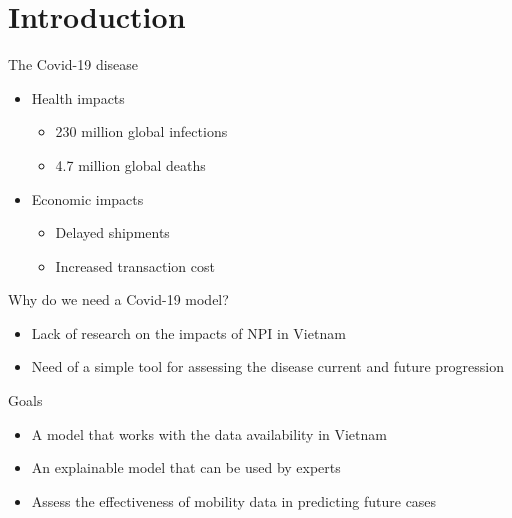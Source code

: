 \section{Introduction}

\begin{frame}{The Covid-19 disease}
\begin{itemize}
    \item<1-> Health impacts
    \begin{itemize}
        \item 230 million global infections
        \item 4.7 million global deaths
    \end{itemize}

    \item<2-> Economic impacts
    \begin{itemize}
        \item Delayed shipments
        \item Increased transaction cost
    \end{itemize}
\end{itemize}
\end{frame}

\begin{frame}{Why do we need a Covid-19 model?}
\begin{itemize}
    \item<1-> Lack of research on the impacts of \gls{NPI} in Vietnam
    \item<2-> Need of a simple tool for assessing the disease current and future progression
\end{itemize}
\end{frame}

\begin{frame}{Goals}
\begin{itemize}
    \item<1-> A model that works with the data availability in Vietnam
    \item<2-> An explainable model that can be used by experts
    \item<3-> Assess the effectiveness of mobility data in predicting future cases
\end{itemize}
\end{frame}